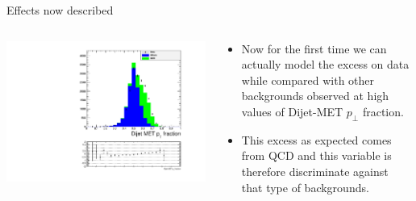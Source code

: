 \documentclass[8pt]{beamer}
\begin{document}
\begin{frame}{Effects now described}

\begin{columns}
 
\begin{block}{}
 
\includegraphics[width=\linewidth]{img/DEta3p6_MetSig3p0_MinDPhiJetsMet1p5/dijetmet_ptfraction.pdf}

\end{block}

\begin{block}

\begin{itemize}
  \item Now for the first time we can actually model the excess on data while compared with other backgrounds observed at high values of Dijet-MET $p_{\perp}$ fraction.
  \item This excess as expected comes from QCD and this variable is therefore discriminate against that type of backgrounds. 
\end{itemize}

\end{block}

\end{columns}

\end{frame}
\end{document}

